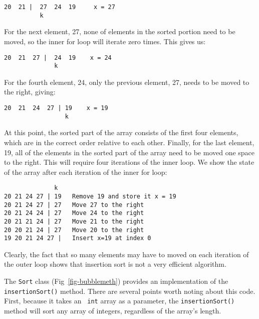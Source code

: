 \begin{jjjlisting}
\begin{lstlisting}
20  21 |  27  24  19     x = 27
          k  
\end{lstlisting}
\end{jjjlisting}

\noindent For the next element, 27, none of elements
in the sorted portion need to be moved, so the inner for loop
will iterate zero times. This gives us:

\begin{jjjlisting}
\begin{lstlisting}
20  21  27 |  24  19    x = 24
              k 
\end{lstlisting}
\end{jjjlisting}

\noindent For the fourth element, 24, only the previous element, 27,
needs to be moved to the right, giving:

\begin{jjjlisting}
\begin{lstlisting}
20  21  24  27 | 19    x = 19
                 k 
\end{lstlisting}
\end{jjjlisting}

\noindent At this point, the sorted part of the array consists of the
first four elements, which are in the correct order relative to each
other.  Finally, for the last element, 19, all of the elements in the
sorted part of the array need to be moved one space to the right.
This will require four iterations of the inner loop. We show the state
of the array after each iteration of the inner for loop:

\begin{jjjlisting}
\begin{lstlisting}
              k
20 21 24 27 | 19   Remove 19 and store it x = 19  
20 21 24 27 | 27   Move 27 to the right
20 21 24 24 | 27   Move 24 to the right
20 21 21 24 | 27   Move 21 to the right
20 20 21 24 | 27   Move 20 to the right
19 20 21 24 27 |   Insert x=19 at index 0
\end{lstlisting}
\end{jjjlisting}

\noindent Clearly, the fact that so many elements may have to moved on
each iteration of the outer loop shows that insertion sort is not
a very efficient algorithm.

The {\tt Sort} class (Fig~\ref{fig-bubblemeth}) provides an
implementation of the {\tt insertionSort()} method.  There are several
points worth noting about this code. First, because it takes an {\tt
int} array as a parameter, the {\tt insertionSort()} method will sort
any array of integers, regardless of the array's length.

